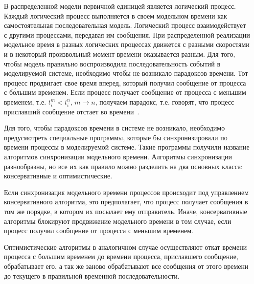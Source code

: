 В распределенной модели первичной единицей является логический процесс. Каждый логический процесс выполняется в своем модельном времени как самостоятельная последовательная модель. Логический процесс взаимодействует с другими процессами, передавая им сообщения. При распределенной реализации модельное время в разных логических процессах движется с разными скоростями и в некоторый произвольный момент времени оказывается разным. Для того, чтобы модель правильно воспроизводила последовательность событий в моделируемой системе, необходимо чтобы не возникало парадоксов времени. Тот процесс продвигает свое время вперед, который получил сообщение от процесса с б\'ольшим временем. Если процесс получает сообщение от процесса с меньшим временем, т.е. $t_i^m<t_i^n, \, m \to n$, получаем парадокс, т.е. говорят, что процесс приславший сообщение  отстает во времени~\cite{okol}.

Для того, чтобы парадоксов времени в системе не возникало, необходимо предусмотреть специальные программы, которые бы синхронизировали по времени процессы в моделируемой системе. Такие программы получили название алгоритмов синхронизации модельного времени. Алгоритмы синхронизации разнообразны, но все их как правило можно разделить на два основных класса: консервативные и оптимистические.

Если синхронизация модельного времени процессов происходит под управлением консервативного алгоритма, это предполагает, что процесс получает сообщения в том же порядке, в котором их посылает ему отправитель.
Иначе, консервативные алгоритмы блокируют продвижение модельного времени в том случае, если процесс получил сообщение от процесса с меньшим временем.

Оптимистические алгоритмы в аналогичном случае осуществляют откат времени процесса с большим временем до времени процесса, приславшего сообщение, обрабатывает его, а так же заново обрабатывают все сообщения от этого времени до текущего в правильной временной последовательности.


